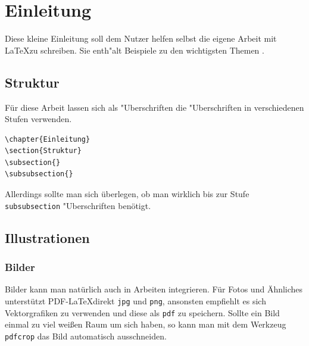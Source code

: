 \chapter{Einleitung}

Diese kleine Einleitung soll dem Nutzer helfen selbst die eigene Arbeit mit \LaTeX zu schreiben. Sie enth"alt Beispiele zu den wichtigsten Themen .


\section{Struktur}

Für diese Arbeit lassen sich als "Uberschriften die "Uberschriften in verschiedenen Stufen verwenden.

\begin{verbatim}
\chapter{Einleitung}
\section{Struktur}
\subsection{}
\subsubsection{}
\end{verbatim}

Allerdings sollte man sich überlegen, ob man wirklich bis zur Stufe \verb|subsubsection| "Uberschriften benötigt.



\section{Illustrationen}


\subsection{Bilder}

Bilder kann man natürlich auch in Arbeiten integrieren. Für Fotos und Ähnliches unterstützt PDF-\LaTeX direkt \verb|jpg| und \verb|png|, ansonsten empfiehlt es sich Vektorgrafiken zu verwenden und diese als \verb|pdf| zu speichern. Sollte ein Bild einmal zu viel weißen Raum um sich haben, so kann man mit dem Werkzeug \verb|pdfcrop| das Bild automatisch ausschneiden\cite{pdfcrop}.

